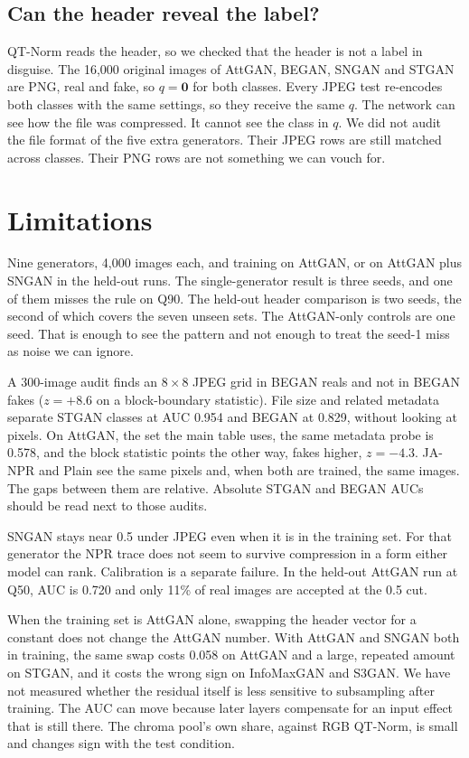 \documentclass[conference]{IEEEtran}
\begin{document}
\subsection{Can the header reveal the label?}
QT-Norm reads the header, so we checked that the header is not a label in disguise. The 16{,}000 original images of AttGAN, BEGAN, SNGAN and STGAN are PNG, real and fake, so $q=\mathbf{0}$ for both classes. Every JPEG test re-encodes both classes with the same settings, so they receive the same $q$. The network can see how the file was compressed. It cannot see the class in $q$. We did not audit the file format of the five extra generators. Their JPEG rows are still matched across classes. Their PNG rows are not something we can vouch for.

\section{Limitations}
\label{sec:limits}
Nine generators, 4{,}000 images each, and training on AttGAN, or on AttGAN plus SNGAN in the held-out runs. The single-generator result is three seeds, and one of them misses the rule on Q90. The held-out header comparison is two seeds, the second of which covers the seven unseen sets. The AttGAN-only controls are one seed. That is enough to see the pattern and not enough to treat the seed-1 miss as noise we can ignore.

A 300-image audit finds an $8{\times}8$ JPEG grid in BEGAN reals and not in BEGAN fakes ($z{=}{+}8.6$ on a block-boundary statistic). File size and related metadata separate STGAN classes at AUC 0.954 and BEGAN at 0.829, without looking at pixels. On AttGAN, the set the main table uses, the same metadata probe is 0.578, and the block statistic points the other way, fakes higher, $z{=}{-}4.3$. JA-NPR and Plain see the same pixels and, when both are trained, the same images. The gaps between them are relative. Absolute STGAN and BEGAN AUCs should be read next to those audits.

SNGAN stays near 0.5 under JPEG even when it is in the training set. For that generator the NPR trace does not seem to survive compression in a form either model can rank. Calibration is a separate failure. In the held-out AttGAN run at Q50, AUC is 0.720 and only 11\% of real images are accepted at the 0.5 cut.

When the training set is AttGAN alone, swapping the header vector for a constant does not change the AttGAN number. With AttGAN and SNGAN both in training, the same swap costs 0.058 on AttGAN and a large, repeated amount on STGAN, and it costs the wrong sign on InfoMaxGAN and S3GAN. We have not measured whether the residual itself is less sensitive to subsampling after training. The AUC can move because later layers compensate for an input effect that is still there. The chroma pool's own share, against RGB QT-Norm, is small and changes sign with the test condition.
\end{document}
